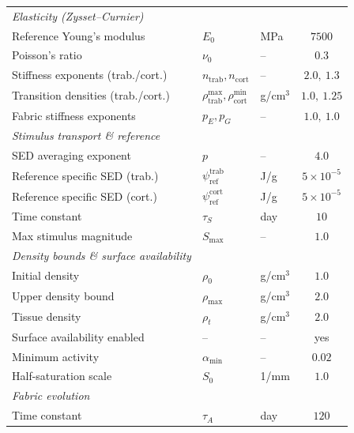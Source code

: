 \begin{table}[!htbp]
\begin{tabularx}{\textwidth}{@{} >{\raggedright\arraybackslash}X l l r r @{}}
    \midrule
    \multicolumn{5}{c}{\textbf{II. Shared parameters}} \\
    \midrule
    \textit{Elasticity (Zysset--Curnier)} & & & & \\
    Reference Young's modulus & $E_0$ & MPa & \multicolumn{2}{c}{$7500$} \\
    Poisson's ratio & $\nu_0$ & -- & \multicolumn{2}{c}{$0.3$} \\
    Stiffness exponents (trab./cort.) & $n_{\mathrm{trab}}, n_{\mathrm{cort}}$ & -- & \multicolumn{2}{c}{$2.0, \ 1.3$} \\
    Transition densities (trab./cort.) & $\rho_{\mathrm{trab}}^{\max}, \rho_{\mathrm{cort}}^{\min}$ & g/cm$^3$ & \multicolumn{2}{c}{$1.0, \ 1.25$} \\
    Fabric stiffness exponents & $p_E, p_G$ & -- & \multicolumn{2}{c}{$1.0, \ 1.0$} \\
    \addlinespace
    \textit{Stimulus transport \& reference} & & & & \\
    SED averaging exponent & $p$ & -- & \multicolumn{2}{c}{$4.0$} \\
    Reference specific SED (trab.) & $\psi_{\mathrm{ref}}^{\mathrm{trab}}$ & J/g & \multicolumn{2}{c}{$5\times 10^{-5}$} \\
    Reference specific SED (cort.) & $\psi_{\mathrm{ref}}^{\mathrm{cort}}$ & J/g & \multicolumn{2}{c}{$5\times 10^{-5}$} \\
    Time constant & $\tau_S$ & day & \multicolumn{2}{c}{$10$} \\
    Max stimulus magnitude & $S_{\max}$ & -- & \multicolumn{2}{c}{$1.0$} \\
    \addlinespace
    \textit{Density bounds \& surface availability} & & & & \\
    Initial density & $\rho_0$ & g/cm$^3$ & \multicolumn{2}{c}{$1.0$} \\
    Upper density bound & $\rho_{\max}$ & g/cm$^3$ & \multicolumn{2}{c}{$2.0$} \\
    Tissue density & $\rho_{t}$ & g/cm$^3$ & \multicolumn{2}{c}{$2.0$} \\
    Surface availability enabled & -- & -- & \multicolumn{2}{c}{yes} \\
    Minimum activity & $\alpha_{\min}$ & -- & \multicolumn{2}{c}{$0.02$} \\
    Half-saturation scale & $S_0$ & 1/mm & \multicolumn{2}{c}{$1.0$} \\
    \addlinespace
    \textit{Fabric evolution} & & & & \\
    Time constant & $\tau_A$ & day & \multicolumn{2}{c}{$120$} \\

\end{tabularx}
\end{table}
